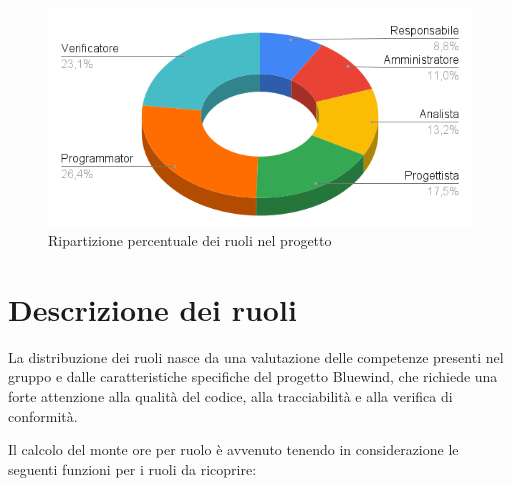 \documentclass[a4paper,12pt]{article}
\begin{document}
\begin{figure}[h]
    \centering
    \includegraphics[width=14cm]{img/SuddivisioneRuoli.png}
    \caption{Ripartizione percentuale dei ruoli nel progetto}
\end{figure}

\newpage

\section{Descrizione dei ruoli}
La distribuzione dei ruoli nasce da una valutazione delle competenze presenti nel gruppo e dalle caratteristiche specifiche del progetto Bluewind, che richiede una forte attenzione alla qualità del codice, alla tracciabilità e alla verifica di conformità.

Il calcolo del monte ore per ruolo è avvenuto tenendo in considerazione le seguenti funzioni per i ruoli da ricoprire:
        
\end{document}

